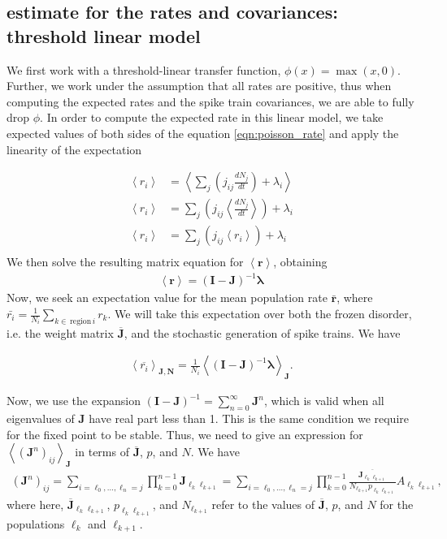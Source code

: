 \documentclass [12pt]{amsart}
\newcommand{\matr}[1]{\mathbf{#1}} %
\renewcommand{\vec}[1]{\mathbf{#1}} %
\newcommand\abk[1]{\left\langle #1 \right\rangle}
\theoremstyle{definition}
\newcommand{\inv}{^{-1}}
\begin{document}
\subsection{estimate for the rates and covariances: threshold linear model}
We first work with a threshold-linear transfer function, $\phi(x) = \max(x,0)$. Further, we work under the assumption that all rates are positive, thus when computing the expected rates and the spike train covariances, we are able to fully drop $\phi$. In order to compute the expected rate in this linear model, we take expected values of both sides of the equation \ref{eqn:poisson_rate} and apply the linearity of the expectation

\begin{align*}
\abk{r_i} &= \abk{\sum_{j} \left(j_{ij} \frac{dN_j}{dt}\right) + \lambda_i}\\
\abk{r_i} &= \sum_{j} \left(j_{ij} \abk{\frac{dN_j}{dt}}\right) + \lambda_i\\
\abk{r_i} &= \sum_{j} \left(j_{ij} \abk{r_i}\right) + \lambda_i\\
\end{align*}
We then solve the resulting matrix equation for $\abk{\vec r}$, obtaining 
\begin{align}
\abk{\vec r} = (\matr I - \matr J)\inv \vec \lambda  
\label{eqn:expected_rate}
\end{align}
Now, we seek an expectation value for the mean population rate $\bar{\vec r}$, where $\bar{r_i} = \frac{1}{N_i} \sum_{k\in\, \mathrm{ region }\, i} r_k$. We will take this expectation over both the frozen disorder, i.e. the weight matrix $\overline {\vec J}$, and the stochastic generation of spike trains. We have

\begin{align*}
\abk{\overline{r_i}}_{\matr J, \vec N} = \frac{1}{N_i}\abk{(\matr I - \matr J)\inv \vec \lambda }_{\matr J}. 
\end{align*}

Now, we use the expansion $(\matr I - \matr J)\inv = \sum_{n = 0}^\infty \matr {J}^n$, which is valid when all eigenvalues of $\matr J$ have real part less than 1. This is the same condition we require for the fixed point to be stable. Thus, we need to give an expression for $\abk{(\matr J^n)_{ij}}_{\matr J}$ in terms of $\overline {\matr J}$, $p$, and $N$. 
We have 
\begin{align*}
(\matr J^n)_{ij} = \sum_{i = \ell_0, \ldots, \ell_n = j} \prod_{k = 0}^{n-1} \matr J_{\ell_k \ell_{k+1}} 
= \sum_{i = \ell_0, \ldots, \ell_n = j} \prod_{k = 0}^{n-1} \frac{\overline{\matr J_{\ell_k \ell_{k+1}}}}{N_{\ell_{k+1}} p_{\ell_{k}\ell_{k+1}}}A_{\ell_{k}\ell_{k+1}},
\end{align*}
where here, $\overline{\matr J}_{\ell_k \ell_{k+1}}$, $ p_{\ell_{k}\ell_{k+1}}$, and $N_{\ell_{k+1}}$ refer to the values of $\overline{\matr J}$, $p$, and $N$ for the populations $\ell_k$ and  $\ell_{k+1}$.
\end{document}
